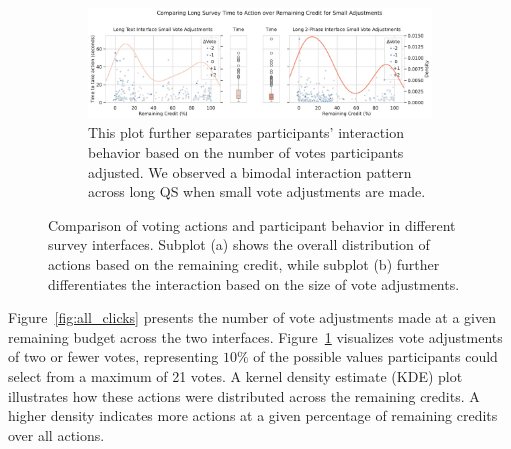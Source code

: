 \begin{figure}[h]
    \begin{subfigure}[b]{\textwidth}
        \centering
        \includegraphics[width=\textwidth]{content/image/results/small_adjustments_plot.pdf}
        \caption{This plot further separates participants' interaction behavior based on the number of votes participants adjusted. We observed a bimodal interaction pattern across long QS when small vote adjustments are made.}

        \label{fig:small_clicks}
    \end{subfigure}
    
    \caption{Comparison of voting actions and participant behavior in different survey interfaces. Subplot (a) shows the overall distribution of actions based on the remaining credit, while subplot (b) further differentiates the interaction based on the size of vote adjustments.}
    \label{fig:combined_voting_behavior}
\end{figure}

Figure~\ref{fig:all_clicks} presents the number of vote adjustments made at a given remaining budget across the two interfaces. Figure~\ref{fig:small_clicks} visualizes vote adjustments of two or fewer votes, representing $10\%$ of the possible values participants could select from a maximum of 21 votes. A kernel density estimate (KDE) plot illustrates how these actions were distributed across the remaining credits. A higher density indicates more actions at a given percentage of remaining credits over all actions.


